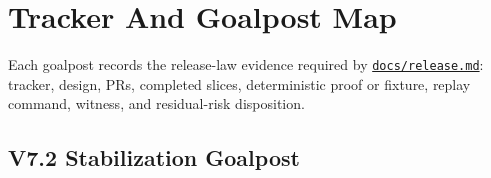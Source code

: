 \section{Tracker And Goalpost Map}\label{record-261-tracker-and-goalpost-map}

Each goalpost records the release-law evidence required by \href{https://github.com/flyingrobots/bijou/blob/cbd70612140e7a450d764b3c7be1c6af878b99bc/docs/release.md}{\texttt{d\allowbreak{}o\allowbreak{}c\allowbreak{}s\allowbreak{}/\allowbreak{}r\allowbreak{}e\allowbreak{}l\allowbreak{}e\allowbreak{}a\allowbreak{}s\allowbreak{}e\allowbreak{}.\allowbreak{}m\allowbreak{}d}}: tracker, design, PRs, completed slices, deterministic proof or fixture, replay command, witness, and residual-risk disposition.

\subsection{V7.2 Stabilization Goalpost}\label{record-261-v7.2-stabilization-goalpost}

